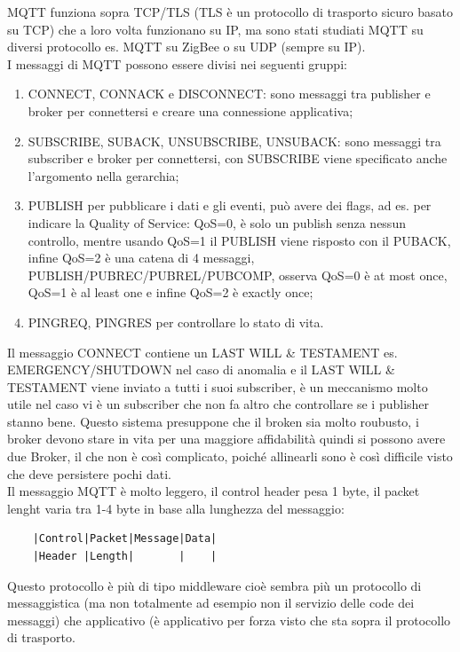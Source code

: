 \documentclass[11pt, twocolumn]{article}
\newenvironment{myenumerate}
{ \begin{enumerate}[topsep=0ex]
		\setlength{\itemsep}{0pt}
		\setlength{\parskip}{0pt}
		\setlength{\parsep}{0pt}     }
	{ \end{enumerate}                  }
\begin{document}
MQTT funziona sopra TCP/TLS (TLS è un protocollo di trasporto sicuro basato su TCP) che a loro volta funzionano su IP, ma sono stati studiati MQTT su diversi protocollo es. MQTT su ZigBee o su UDP (sempre su IP). \\
I messaggi di MQTT possono essere divisi nei seguenti gruppi:
\begin{myenumerate} 
\item CONNECT, CONNACK e DISCONNECT: sono messaggi tra publisher e broker per connettersi e creare una connessione applicativa;

\item SUBSCRIBE, SUBACK, UNSUBSCRIBE, UNSUBACK: sono messaggi tra subscriber e broker per connettersi, con SUBSCRIBE viene specificato anche l'argomento nella gerarchia; 

\item PUBLISH per pubblicare i dati e gli eventi, può avere dei flags, ad es. per indicare la Quality of Service: QoS=0, è solo un publish senza nessun controllo, mentre usando QoS=1 il PUBLISH viene risposto con il PUBACK, infine QoS=2 è una catena di 4 messaggi, PUBLISH/PUBREC/PUBREL/PUBCOMP, osserva QoS=0 è at most once,  QoS=1 è al least one e infine QoS=2 è exactly once; 

\item PINGREQ, PINGRES per controllare lo stato di vita. 
\end{myenumerate} 
Il messaggio CONNECT contiene un LAST WILL \& TESTAMENT es. EMERGENCY/SHUTDOWN nel caso di anomalia e il LAST WILL \& TESTAMENT viene inviato a tutti i suoi subscriber, è un meccanismo molto utile nel caso vi è un subscriber che non fa altro che controllare se i publisher stanno bene. 
Questo sistema presuppone che il broken sia molto roubusto, i broker devono stare in vita per una maggiore affidabilità quindi si possono avere due Broker, il che non è così complicato, poiché allinearli sono è così difficile visto che deve persistere pochi dati.\\  
Il messaggio MQTT è molto leggero, il control header pesa 1 byte, il packet lenght varia tra 1-4 byte in base alla lunghezza del messaggio:
\begin{verbatim}
    |Control|Packet|Message|Data|
    |Header |Length|       |    |
\end{verbatim}
Questo protocollo è più di tipo middleware cioè sembra più un protocollo di messaggistica (ma non totalmente ad esempio non il servizio delle code dei messaggi) che applicativo (è applicativo per forza visto che sta sopra il protocollo di trasporto.
\end{document}
